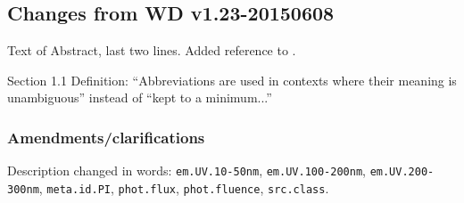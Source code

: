 \documentclass[11pt,a4paper]{ivoa}
\begin{document}
\subsection{Changes from WD v1.23-20150608}
Text of Abstract, last two lines. Added reference to \citet{tn:solar-system-ucd}.

Section 1.1 Definition: ``Abbreviations are used in contexts where their meaning is unambiguous'' instead of ``kept to a minimum...''

\subsubsection*{Amendments/clarifications}
Description changed in words: {\tt em.UV.10-50nm}, {\tt em.UV.100-200nm}, {\tt em.UV.200-300nm}, {\tt meta.id.PI}, 
{\tt phot.flux}, {\tt phot.fluence}, {\tt src.class}.
\end{document}
